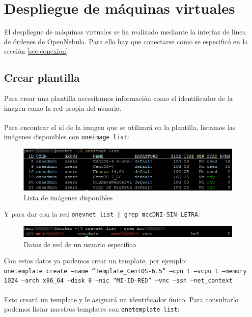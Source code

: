 \section{Despliegue de máquinas virtuales}

El despliegue de máquinas virtuales se ha realizado mediante la interfaz de línea de órdenes de OpenNebula. Para ello hay que conectarse como se especificó en la sección \ref{sec:conexion}.

\label{sec:crear-plantilla}
\subsection{Crear plantilla}

Para crear una plantilla necesitamos información como el identificador de la imagen como la red propia del usuario.
\\ \\
Para encontrar el id de la imagen que se utilizará en la plantilla, listamos las imágenes disponibles con \texttt{oneimage list}:

\begin{figure}[H]
	\centering
	\includegraphics[width=14cm]{img/oneimage-list}
	\caption{Lista de imágenes disponibles}
	\label{fig:one-image-list}
\end{figure}

Y para dar con la red \texttt{onevnet list | grep mccDNI-SIN-LETRA}:

\begin{figure}[H]
	\centering
	\includegraphics[width=14cm]{img/onevnet-list}
	\caption{Datos de red de un usuario específico}
	\label{fig:onevnet-list}
\end{figure}

Con estos datos ya podemos crear un template, por ejemplo:
\\
\texttt{onetemplate create --name ``Template\_CentOS-6.5'' --cpu 1 --vcpu 1 --memory 1024 --arch x86\_64 --disk 8 --nic ``MI-ID-RED'' --vnc --ssh --net\_context}
\\ \\
Esto creará un template y le asignará un identificador único. Para consultarlo podemos listar nuestros templates con \texttt{onetemplate list}:

